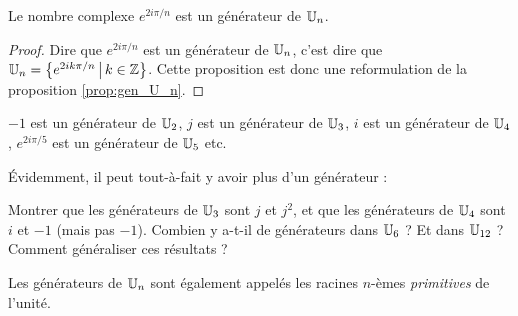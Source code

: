 \begin{proposition}
Le nombre complexe $e^{2i\pi/n}$ est un générateur de $\mathbb{U}_n$.
\end{proposition}
\begin{proof}
Dire que $e^{2i\pi/n}$ est un générateur de $\mathbb{U}_n$, c'est dire que $\U_n=\ensemble{e^{2ik\pi/n}}{k\in \Z}$. Cette proposition est donc une reformulation de la proposition \ref{prop:gen_U_n}.
\end{proof}

\begin{exemples}
$-1$ est un générateur de $\mathbb{U}_2$, $j$ est un générateur de $\mathbb{U}_3$, $i$ est un générateur de $\mathbb{U}_4$, $e^{2i\pi/5}$ est un générateur de $\mathbb{U}_5$ etc.
\end{exemples}

Évidemment, il peut tout-à-fait y avoir plus d'un générateur : 

\begin{exercice}
Montrer que les générateurs de $\mathbb{U}_3$ sont $j$ et $j^2$, et que les générateurs de $\mathbb{U}_4$ sont $i$ et $-1$ (mais pas $-1$). Combien y a-t-il de générateurs dans $\mathbb{U}_6$ ? Et dans $\mathbb{U}_{12}$ ? Comment généraliser ces résultats ?
\end{exercice}

\begin{definition}
Les générateurs de $\mathbb{U}_n$ sont également appelés les racines $n$-èmes \emph{primitives} de l'unité.
\end{definition}

